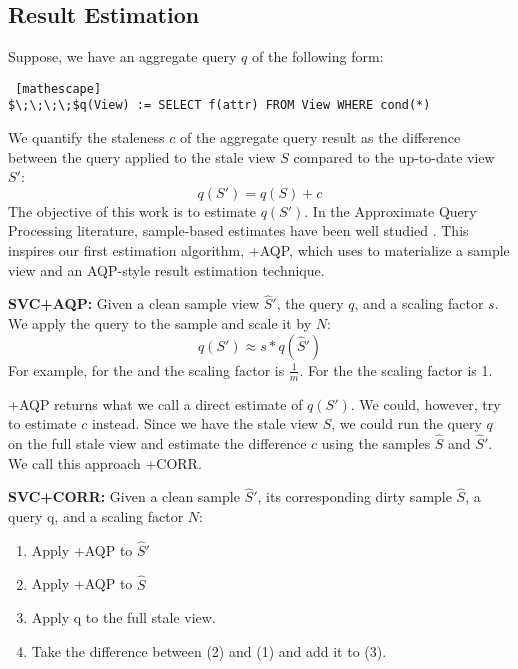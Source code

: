 \subsection{Result Estimation}
Suppose, we have an aggregate query $q$ of the following form:
\begin{lstlisting} [mathescape]
$\;\;\;\;$q(View) := SELECT f(attr) FROM View WHERE cond(*)
\end{lstlisting}
We quantify the staleness $c$ of the aggregate query result as the difference
between the query applied to the stale view $S$ compared to the up-to-date view $S'$:
\[
q(S') = q(S) + c
\]
The objective of this work is to estimate $q(S')$.
In the Approximate Query Processing literature, sample-based estimates have been well studied \cite{OlkenR86, AgarwalMPMMS13}.
This inspires our first estimation algorithm, \svcnospace+AQP, which uses \svc to materialize a sample view and an AQP-style
result estimation technique.

\vspace{0.25em}

\noindent\textbf{SVC+AQP: }  Given a clean sample view $\widehat{S}'$, the query $q$, and a scaling factor $s$.
We apply the query to the sample and scale it by $N$:
\[
q(S') \approx s*q(\widehat{S}')
\]
For example, for the \sumfunc and \countfunc the scaling factor is $\frac{1}{m}$. For the \avgfunc the scaling factor is 1.

\svcnospace+AQP returns what we call a direct estimate of $q(S')$.
We could, however, try to estimate $c$ instead.
Since we have the stale view $S$, we could run the query $q$ on the full stale view and 
estimate the difference $c$ using the samples $\widehat{S}$ and $\widehat{S}'$.
We call this approach \svcnospace+CORR.

\vspace{0.25em}

\noindent\textbf{SVC+CORR: } Given a clean sample $\widehat{S}'$, its corresponding dirty sample $\widehat{S}$, a query q, and a scaling factor $N$:
\begin{enumerate}[noitemsep]
\item Apply \svcnospace+AQP to $\widehat{S}'$
\item Apply \svcnospace+AQP to $\widehat{S}$
\item Apply q to the full stale view.
\item Take the difference between (2) and (1) and add it to (3).
\end{enumerate}

